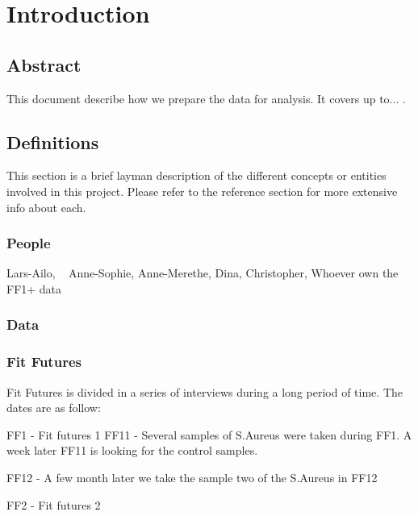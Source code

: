 \chapter{Introduction}\label{ch:introduction}

\section{Abstract}

This document describe how we prepare the data for analysis. It covers up to...  .\vspace{3 mm}

\section{Definitions}

This section is a brief layman description of the different concepts or entities involved in this project. Please refer to the reference section for more extensive info about each.\vspace{3 mm}

\subsection{People}

Lars-Ailo, ~\cite{ref:larsab} 
Anne-Sophie, \cite{ref:annesofie}
Anne-Merethe,
Dina,
Christopher,
Whoever own the FF1+ data\vspace{3 mm}

\subsection{Data}
\subsection{Fit Futures}

Fit Futures is divided in a series of interviews during a long period of time. The dates are as follow:

FF1 - Fit futures 1
FF11 - Several samples of S.Aureus were taken during FF1. A week later FF11 is looking for the control samples.

FF12 - A few month later we take the sample two of the S.Aureus in FF12

FF2 - Fit futures 2

